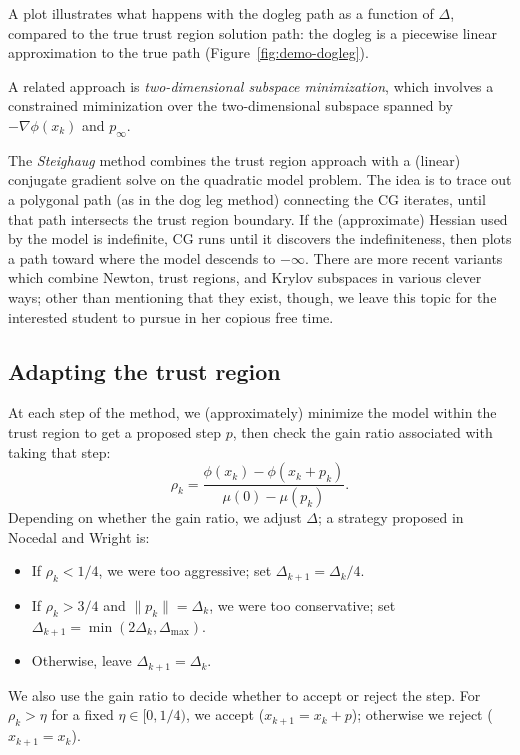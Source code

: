 \documentclass[12pt, leqno]{article} %
\providecommand{\tightlist}{%
  \setlength{\itemsep}{0pt}\setlength{\parskip}{0pt}}
\begin{document}
A plot illustrates what happens with the dogleg path as a function of
$\Delta$, compared to the true trust region solution path: the dogleg
is a piecewise linear approximation to the true path
(Figure~\ref{fig:demo-dogleg}).

A related approach is \emph{two-dimensional subspace minimization},
which involves a constrained miminization over the two-dimensional
subspace spanned by \(-\nabla \phi(x_k)\) and \(p_{\infty}\).

The \emph{Steighaug} method combines the trust region approach with a
(linear) conjugate gradient solve on the quadratic model problem. The
idea is to trace out a polygonal path (as in the dog leg method)
connecting the CG iterates, until that path intersects the trust region
boundary. If the (approximate) Hessian used by the model is indefinite,
CG runs until it discovers the indefiniteness, then plots a path toward
where the model descends to \(-\infty\). There are more recent variants
which combine Newton, trust regions, and Krylov subspaces in various
clever ways; other than mentioning that they exist, though, we leave
this topic for the interested student to pursue in her copious free
time.

\subsection{Adapting the trust region}

At each step of the method, we (approximately) minimize the model within
the trust region to get a proposed step \(p\), then check the gain ratio
associated with taking that step:
\[\rho_k = \frac{\phi(x_k)-\phi(x_k+p_k)}{\mu(0)-\mu(p_k)}.\] Depending
on whether the gain ratio, we adjust \(\Delta\); a strategy proposed in
Nocedal and Wright is:

\begin{itemize}
\tightlist
\item
  If \(\rho_k < 1/4\), we were too aggressive; set
  \(\Delta_{k+1} = \Delta_k/4\).
\item
  If \(\rho_k > 3/4\) and \(\|p_k\| = \Delta_k\), we were too
  conservative; set \(\Delta_{k+1} = \min(2\Delta_k, \Delta_{\max})\).
\item
  Otherwise, leave \(\Delta_{k+1} = \Delta_k\).
\end{itemize}

We also use the gain ratio to decide whether to accept or reject the
step. For \(\rho_k > \eta\) for a fixed \(\eta \in [0,1/4)\), we accept
(\(x_{k+1} = x_k+p\)); otherwise we reject (\(x_{k+1} = x_k\)).
\end{document}
